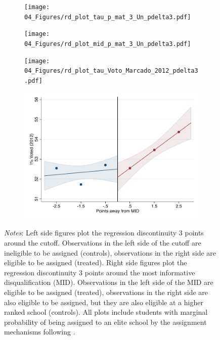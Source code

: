 \documentclass[oneside,11pt]{article}
\begin{document}
\begin{figure}[H]
\begin{center}
    \begin{subfigure}{0.475\textwidth}
        \centering
        \texttt{[image: 04\_Figures/rd\_plot\_tau\_p\_mat\_3\_Un\_pdelta3.pdf]}
    \end{subfigure}
    \begin{subfigure}{0.475\textwidth}
        \centering
        \texttt{[image: 04\_Figures/rd\_plot\_mid\_p\_mat\_3\_Un\_pdelta3.pdf]}
    \end{subfigure}

    \begin{subfigure}{0.475\textwidth}
        \centering
        \texttt{[image: 04\_Figures/rd\_plot\_tau\_Voto\_Marcado\_2012\_pdelta3.pdf]}
    \end{subfigure}
    \begin{subfigure}{0.475\textwidth}
        \centering
        \includegraphics[width=\textwidth]{04_Figures/rd_plot_mid_Voto_Marcado_2012_pdelta3.pdf}
    \end{subfigure}
    \end{center}
    
\footnotesize
\textit{Notes}: Left side figures plot the regression discontinuity 3 points around the cutoff. Observations in the left side of the cutoff are ineligible to be assigned (controls), observations in the right side are eligible to be assigned (treated). Right side figures plot the regression discontinuity 3 points around the most informative disqualification (MID). Observations in the left side of the MID are eligible to be assigned (treated), observations in the right side are also eligible to be assigned, but they are also eligible at a higher ranked school (controls). All plots include students with marginal probability of being assigned to an elite school by the assignment mechanisms following \citet{abdulkadirouglu2022breaking}. 
\end{figure}
\end{document}
